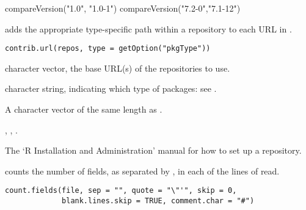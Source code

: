 %
\begin{Examples}
\begin{ExampleCode}
compareVersion("1.0", "1.0-1")
compareVersion("7.2-0","7.1-12")
\end{ExampleCode}
\end{Examples}
%
\begin{Description}\relax
{} adds the appropriate type-specific path within a
repository to each URL in .
\end{Description}
%
\begin{Usage}
\begin{verbatim}
contrib.url(repos, type = getOption("pkgType"))
\end{verbatim}
\end{Usage}
%
\begin{Arguments}
\begin{ldescription}
\item[\code{repos}] character vector, the base URL(s) of the repositories
to use.

\item[\code{type}] character string, indicating which type of packages: see
.

\end{ldescription}
\end{Arguments}
%
\begin{Value}
A character vector of the same length as .
\end{Value}
%
\begin{SeeAlso}\relax
{}, ,
.

The `R Installation and Administration' manual for how to 
set up a repository.
\end{SeeAlso}
%
\begin{Description}\relax
{} counts the number of fields, as separated by
, in each of the lines of  read.
\end{Description}
%
\begin{Usage}
\begin{verbatim}
count.fields(file, sep = "", quote = "\"'", skip = 0,
             blank.lines.skip = TRUE, comment.char = "#")
\end{verbatim}
\end{Usage}
